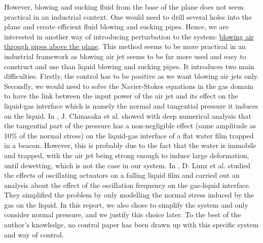 \documentclass[12pt]{article}
\begin{document}
However, blowing and sucking fluid from the base of the plane does not seem practical in an industrial context. One would need to drill several
 holes into the plane and create efficient fluid blowing and sucking pipes. Hence, we are interested in another way of introducing perturbation
  to the system: \underline{blowing air through pipes above the plane}. This method seems to be more practical in an industrial framework as blowing
   air jet seems to be far more used and easy to construct and use than liquid blowing and sucking pipes. It introduces two main difficulties. 
   Firstly, the control has to be positive as we want blowing air jets only. Secondly, we would need to solve the Navier-Stokes equations in the gas domain to 
   have the link between the input power of the air jet and its effect on the liquid-gas interface which is namely the normal and tangential pressure it 
   induces on the liquid. In \cite{Dewetting_Ojiako}, J. Chinasaka et al. showed with deep numerical analysis that the tangential part of the pressure 
   has a non-negligible effect (same amplitude as 10\% of the normal stress) on the liquid-gas interface of a flat water film trapped in a beacon. However, this
    is probably due to the fact that the water is immobile and trapped, with the air jet being strong enough to induce large deformation, until dewetting, which 
    is not the case in our system.  
In \cite{Moving_pressure_source}, D. Lunz et al. studied the effects of oscillating actuators on a falling liquid film and carried out an analysis about the effect of 
the oscillation frequency on the gas-liquid interface. They simplified the problem by only modelling the normal stress induced by the gas on the liquid.  In this report, we also chose
 to simplify the system and only consider normal pressure, and we justify this choice later. To the best of the author's knowledge, no control paper has been 
 drawn up with this specific system and way of control. 
\\
\end{document}
